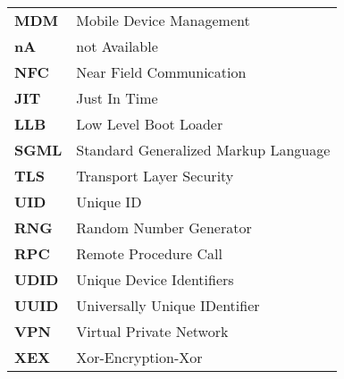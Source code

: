\begin{table*}[htbp]
\begin{tabular}{p{3cm}p{12cm}}
		     \textbf{MDM} & Mobile Device Management \\
		     \textbf{nA} & not Available \\ 	
		     \textbf{NFC} & Near Field Communication \\       
             \textbf{JIT} & Just In Time \\		     
		     \textbf{LLB} & Low Level Boot Loader\\		     
		     \textbf{SGML} & Standard Generalized Markup Language \\
 		     \textbf{TLS} & Transport Layer Security \\ 
 		     \textbf{UID} & Unique ID \\	     
 		     \textbf{RNG} & Random Number Generator\\
 		     \textbf{RPC} & Remote Procedure Call \\	     
 		     \textbf{UDID} & Unique Device Identifiers\\
 		     \textbf{UUID} &  Universally Unique IDentifier \\ 
 		 	 \textbf{VPN} & Virtual Private Network \\
	         \textbf{XEX} &  Xor-Encryption-Xor \\  
		\end{tabular}
\end{table*}